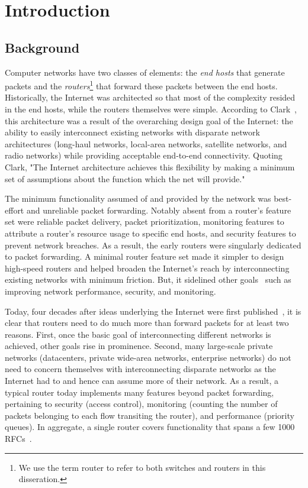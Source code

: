 \chapter{Introduction}
\label{chap:intro}

\section{Background}


Computer networks have two classes of elements: the \textit{end hosts} that
generate packets and the \textit{routers}\footnote{We use the term router to
refer to both switches and routers in this disseration.} that forward these
packets between the end hosts. Historically, the Internet was architected so
that most of the complexity resided in the end hosts, while the routers
themselves were simple. According to Clark~\cite{design_philosophy}, this
architecture was a result of the overarching design goal of the Internet: the
ability to easily interconnect existing networks with disparate network
architectures (\eg long-haul networks, local-area networks, satellite networks,
and radio networks) while providing acceptable end-to-end connectivity. Quoting
Clark, "The Internet architecture achieves this flexibility by making a minimum
set of assumptions about the function which the net will provide."

The minimum functionality assumed of and provided by the network was
best-effort and unreliable packet forwarding. Notably absent from a router's
feature set were reliable packet delivery, packet prioritization, monitoring
features to attribute a router's resource usage to specific end hosts, and
security features to prevent network breaches. As a result, the early routers
were singularly dedicated to packet forwarding. A minimal router feature set
made it simpler to design high-speed routers and helped broaden the Internet's
reach by interconnecting existing networks with minimum friction. But, it
sidelined other goals~\cite{design_philosophy} such as improving network
performance, security, and monitoring.
 
Today, four decades after ideas underlying the Internet were first
published~\cite{cerf74}, it is clear that routers need to do much more than
forward packets for at least two reasons. First, once the basic goal of
interconnecting different networks is achieved, other goals rise in prominence.
Second, many large-scale private networks (\eg datacenters, private wide-area
networks, enterprise networks) do not need to concern themselves with
interconnecting disparate networks as the Internet had to and hence can assume
more of their network. As a result, a typical router today implements many
features beyond packet forwarding, pertaining to security (\eg access control),
monitoring (\eg counting the number of packets belonging to each flow
transiting the router), and performance (\eg priority queues). In aggregate, a
single router covers functionality that spans a few 1000
RFCs~\cite{lavanya_compiler}.

